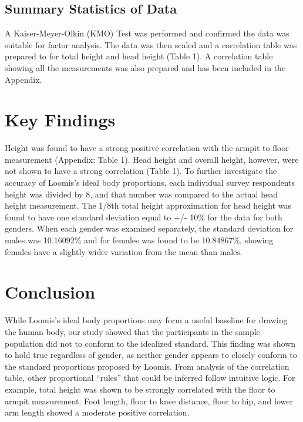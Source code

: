 \documentclass[]{article}
\begin{document}
\subsection{Summary Statistics of Data}
\label{sec:data-summary}

A Kaiser-Meyer-Olkin (KMO) Test was performed and confirmed the data was
suitable for factor analysis. The data was then scaled and a correlation
table was prepared to for total height and head height (Table 1). A
correlation table showing all the measurements was also prepared and has
been included in the Appendix.



\section{Key Findings}
\label{sec:findings}

Height was found to have a strong positive correlation with the armpit
to floor measurement (Appendix: Table 1). Head height and overall
height, however, were not shown to have a strong correlation (Table 1).
To further investigate the accuracy of Loomis's ideal body proportions,
each individual survey respondents height was divided by 8, and that
number was compared to the actual head height measurement. The 1/8th
total height approximation for head height was found to have one
standard deviation equal to +/- 10\% for the data for both genders. When
each gender was examined separately, the standard deviation for males
was 10.16092\% and for females was found to be 10.84867\%, showing
females have a slightly wider variation from the mean than males.

\section{Conclusion}
\label{sec:conclusion}

While Loomis's ideal body proportions may form a useful baseline for
drawing the human body, our study showed that the participants in the
sample population did not to conform to the idealized standard. This
finding was shown to hold true regardless of gender, as neither gender
appears to closely conform to the standard proportions proposed by
Loomis. From analysis of the correlation table, other proportional
``rules'' that could be inferred follow intuitive logic. For example,
total height was shown to be strongly correlated with the floor to
armpit measurement. Foot length, floor to knee distance, floor to hip,
and lower arm length showed a moderate positive correlation.
\end{document}
